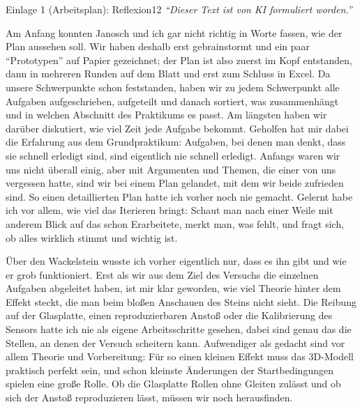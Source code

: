 \begin{umfang}{Einlage 1 (Arbeitsplan): Reflexion}{1}{2}
\noindent\emph{\enquote{Dieser Text ist von KI formuliert worden.}}~\cite{Manevski2026KIArbeitsplan}

Am Anfang konnten Janosch und ich gar nicht richtig in Worte fassen, wie der Plan aussehen soll. Wir haben
deshalb erst gebrainstormt und ein paar \enquote{Prototypen} auf Papier gezeichnet; der Plan ist also
zuerst im Kopf entstanden, dann in mehreren Runden auf dem Blatt und erst zum Schluss in Excel. Da unsere
Schwerpunkte schon feststanden, haben wir zu jedem Schwerpunkt alle Aufgaben aufgeschrieben, aufgeteilt und
danach sortiert, was zusammenhängt und in welchen Abschnitt des Praktikums es passt. Am längsten haben wir
darüber diskutiert, wie viel Zeit jede Aufgabe bekommt. Geholfen hat mir dabei die Erfahrung aus dem
Grundpraktikum: Aufgaben, bei denen man denkt, dass sie schnell erledigt sind, sind eigentlich nie schnell
erledigt. Anfangs waren
wir uns nicht überall einig, aber mit Argumenten und Themen, die einer von uns vergessen hatte, sind wir bei
einem Plan gelandet, mit dem wir beide zufrieden sind. So einen detaillierten Plan hatte ich vorher noch nie
gemacht. Gelernt habe ich vor allem, wie viel das Iterieren bringt: Schaut man nach einer Weile mit anderem
Blick auf das schon Erarbeitete, merkt man, was fehlt, und fragt sich, ob alles wirklich stimmt und wichtig ist.

Über den Wackelstein wusste ich vorher eigentlich nur, dass es ihn gibt und wie er grob funktioniert. Erst
als wir aus dem Ziel des Versuchs die einzelnen Aufgaben abgeleitet haben, ist mir klar geworden, wie viel
Theorie hinter dem Effekt steckt, die man beim bloßen Anschauen des Steins nicht sieht. Die Reibung auf der
Glasplatte, einen reproduzierbaren Anstoß oder die Kalibrierung des Sensors hatte ich nie als eigene
Arbeitsschritte gesehen, dabei sind genau das die Stellen, an denen der Versuch scheitern kann. Aufwendiger
als gedacht sind vor allem Theorie und Vorbereitung: Für so einen kleinen Effekt muss das 3D-Modell praktisch
perfekt sein, und schon kleinste Änderungen der Startbedingungen spielen eine große Rolle. Ob die Glasplatte
Rollen ohne Gleiten zulässt und ob sich der Anstoß reproduzieren lässt, müssen wir noch herausfinden.


\end{umfang}
